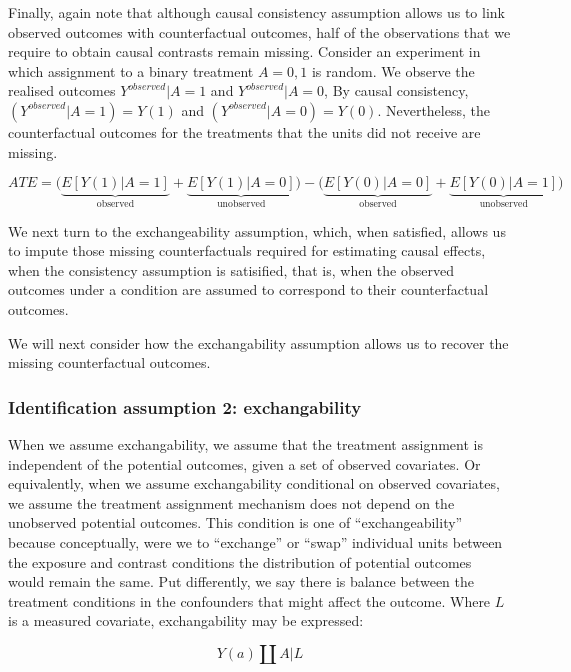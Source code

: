 \documentclass[
  singlecolumn]{report}
\begin{document}
Finally, again note that although causal consistency assumption allows
us to link observed outcomes with counterfactual outcomes, half of the
observations that we require to obtain causal contrasts remain missing.
Consider an experiment in which assignment to a binary treatment
\(A = {0,1}\) is random. We observe the realised outcomes
\(Y^{observed}|A = 1\) and \(Y^{observed}|A = 0\), By causal
consistency, \((Y^{observed}|A = 1) = Y(1)\) and
\((Y^{observed}|A = 0) = Y(0)\). Nevertheless, the counterfactual
outcomes for the treatments that the units did not receive are missing.

\[
ATE = \bigg(\underbrace{E[Y(1)|A = 1]}_\text{observed} + \underbrace{E[Y(1)|A = 0]}_\text{unobserved}\bigg) - \bigg(\underbrace{E[Y(0)|A = 0]}_\text{observed}  + \underbrace{E[Y(0)|A = 1]}_\text{unobserved}\bigg)
\]

We next turn to the exchangeability assumption, which, when satisfied,
allows us to impute those missing counterfactuals required for
estimating causal effects, when the consistency assumption is
satisified, that is, when the observed outcomes under a condition are
assumed to correspond to their counterfactual outcomes.

We will next consider how the exchangability assumption allows us to
recover the missing counterfactual outcomes.

\hypertarget{identification-assumption-2-exchangability}{%
\subsubsection{Identification assumption 2:
exchangability}\label{identification-assumption-2-exchangability}}

When we assume exchangability, we assume that the treatment assignment
is independent of the potential outcomes, given a set of observed
covariates. Or equivalently, when we assume exchangability conditional
on observed covariates, we assume the treatment assignment mechanism
does not depend on the unobserved potential outcomes. This condition is
one of ``exchangeability'' because conceptually, were we to ``exchange''
or ``swap'' individual units between the exposure and contrast
conditions the distribution of potential outcomes would remain the same.
Put differently, we say there is balance between the treatment
conditions in the confounders that might affect the outcome. Where \(L\)
is a measured covariate, exchangability may be expressed:

\[Y(a)\coprod  A|L\]
\end{document}
